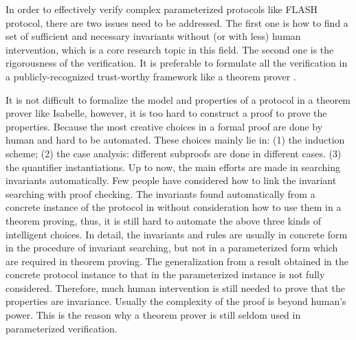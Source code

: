 \documentclass[final]{IEEEtran}
\newcommand\cai[1]{\textcolor{blue}{ #1} }
\begin{document}
{%
In order to effectively verify complex parameterized protocols like FLASH protocol, there are two issues need to be addressed.
The first one is  how to find a set of sufficient and necessary invariants without (or with less) human intervention, which is a core research topic in this field. %
The second one is the rigorousness  of the verification. %
It is preferable to formulate all the verification in a publicly-recognized trust-worthy framework like a theorem prover \cite{Chou2004}.

It is not difficult to  formalize the model and properties of a protocol in a theorem prover like Isabelle, however, it is too hard to construct a  proof to prove the properties. Because the most creative choices in a formal proof are done by human and hard to be automated. These choices mainly lie in: (1) the induction scheme; (2) the case analysis: different subproofs are done in different cases. (3) the quantifier instantiations. Up to now, the main efforts are made in searching invariants automatically. Few people have considered how to link  the invariant searching with proof checking. The invariants found  automatically from   a concrete instance of the protocol in \cite{Arons2001, Conchon2013, Lv2007} without consideration how to use them in a theorem proving, thus, it is still hard to automate the above three kinds of intelligent choices. In detail, the invariants and rules are usually in concrete form in the procedure of invariant searching, but not in a parameterized form which are required in theorem proving. The generalization from a result obtained in the concrete protocol instance  to that in the parameterized instance  is not fully considered. Therefore, much human intervention is still needed to prove that the properties are invariance. Usually the complexity of the proof is  beyond  human's power. This is the reason why a theorem prover is still seldom  used in parameterized verification.

}
\end{document}
